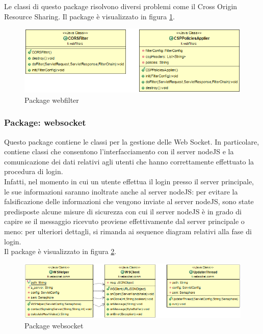 Le classi di questo package risolvono diversi problemi come il Cross Origin Resource Sharing.
Il package è visualizzato in figura \ref{gfx:dependencies_webfilter}.

\begin{figure}[!htbp]
	\centering
	\includegraphics[scale = .5]{img/dependencies_webfilter}
	\caption{Package webfilter}
	\label{gfx:dependencies_webfilter}
\end{figure}


\subsubsection{Package: \textbf{websocket}}

Questo package contiene le classi per la gestione delle Web Socket.
In particolare, contiene classi che consentono l'interfacciamento con il server nodeJS e la comunicazione dei dati relativi agli utenti che hanno correttamente effettuato la procedura di login.\\
Infatti, nel momento in cui un utente effettua il login presso il server principale, le sue informazioni saranno inoltrate anche al server nodeJS: per evitare la falsificazione delle informazioni che vengono inviate al server nodeJS, sono state predisposte alcune misure di sicurezza con cui il server nodeJS è in grado di capire se il messaggio ricevuto proviene effettivamente dal server principale o meno: per ulteriori dettagli, si rimanda ai sequence diagram relativi alla fase di login.\\

Il package è visualizzato in figura \ref{gfx:dependencies_websocket}.

\begin{figure}[!htbp]
	\centering
	\includegraphics[scale = .5]{img/dependencies_websocket}
	\caption{Package websocket}
	\label{gfx:dependencies_websocket}
\end{figure}

